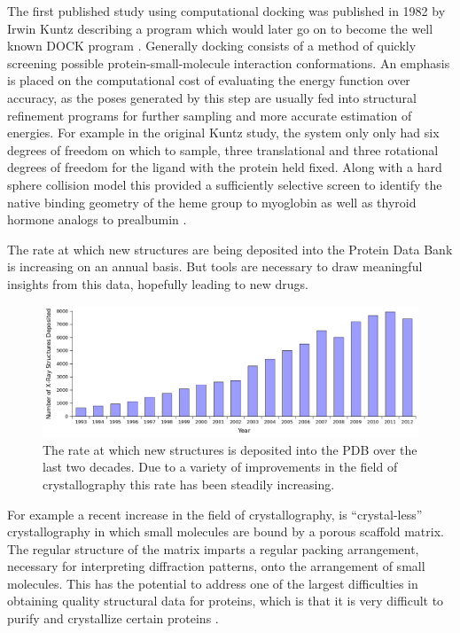 The first published study using computational docking was published in 1982 by Irwin Kuntz describing a program which would later go on to become the well known DOCK program \cite{kuntz1982geometric}.
Generally docking consists of a method of quickly screening possible protein-small-molecule interaction conformations.
An emphasis is placed on the computational cost of evaluating the energy function over accuracy, as the poses generated by this step are usually fed into structural refinement programs for further sampling and more accurate estimation of energies.
For example in the original Kuntz study, the system only only had six degrees of freedom on which to sample, three translational and three rotational degrees of freedom for the ligand with the protein held fixed.
Along with a hard sphere collision model this provided a sufficiently selective screen to identify the native binding geometry of the heme group to myoglobin as well as thyroid hormone analogs to prealbumin \cite{kuntz1982geometric}.

The rate at which new structures are being deposited into the Protein Data Bank is increasing on an annual basis.
But tools are necessary to draw meaningful insights from this data, hopefully leading to new drugs.
\begin{figure}[H]
\begin{center}
\includegraphics[width=\textwidth]{figures/pdb_deposit_rate.png}
\caption{The rate at which new structures is deposited into the PDB over the last two decades.
Due to a variety of improvements in the field of crystallography this rate has been steadily increasing.}
\label{figure:pdb_growth}
\end{center}
\end{figure}

For example a recent increase in the field of crystallography, is ``crystal-less'' crystallography in which small molecules are bound by a porous scaffold matrix.
The regular structure of the matrix imparts a regular packing arrangement, necessary for interpreting diffraction patterns, onto the arrangement of small molecules.
This has the potential to address one of the largest difficulties in obtaining quality structural data for proteins, which is that it is very difficult to purify and crystallize certain proteins \cite{inokuma2013x}.

